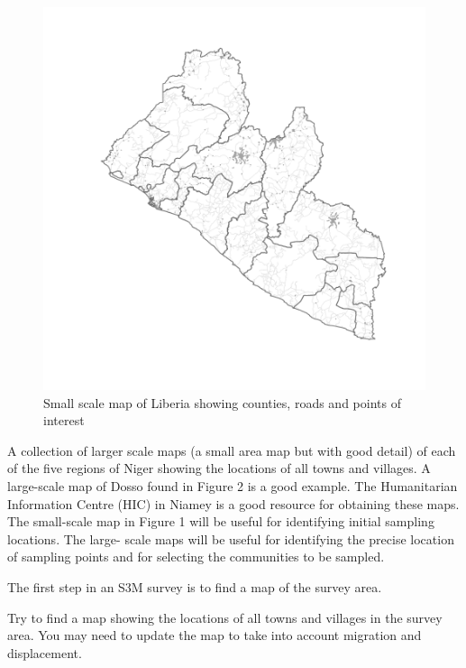 \documentclass[12pt,a4paper]{book}
\theoremstyle{definition}
\theoremstyle{definition}
\theoremstyle{definition}
\theoremstyle{remark}
\begin{document}
\newpage

\begin{figure}[H]

{\centering \includegraphics{figures/smallScaleMap-1} 

}

\caption{Small scale map of Liberia showing counties, roads and points of interest}\label{fig:smallScaleMap}
\end{figure}

\newpage

A collection of larger scale maps (a small area map but with good
detail) of each of the five regions of Niger showing the locations of
all towns and villages. A large-scale map of Dosso found in Figure 2 is
a good example. The Humanitarian Information Centre (HIC) in Niamey is a
good resource for obtaining these maps. The small-scale map in Figure 1
will be useful for identifying initial sampling locations. The large-
scale maps will be useful for identifying the precise location of
sampling points and for selecting the communities to be sampled.

The first step in an S3M survey is to find a map of the survey area.

Try to find a map showing the locations of all towns and villages in the
survey area. You may need to update the map to take into account
migration and displacement.
\end{document}
